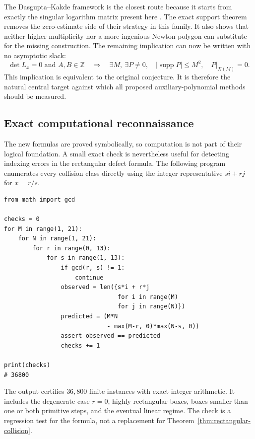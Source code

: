 \documentclass[11pt,oneside]{article}
\theoremstyle{definition}
\theoremstyle{remark}
\newcommand{\Z}{\mathbb Z}
\newcommand{\supp}{\operatorname{supp}}
\begin{document}
The Dasgupta--Kakde framework is the closest route because it starts from exactly the singular
logarithm matrix present here \cite{DasguptaKakde2026}.  The exact support theorem removes the
zero-estimate side of their strategy in this family.  It also shows that neither higher
multiplicity nor a more ingenious Newton polygon can substitute for the missing construction.
The remaining implication can now be written with no asymptotic slack:
\[
  \det L_x=0\text{ and }A,B\in\Z
  \quad\Longrightarrow\quad
  \exists M,\ \exists P\ne0,
  \quad |\supp P|\le M^2,
  \quad P|_{X(M)}=0.
\]
This implication is equivalent to the original conjecture.  It is therefore the natural
central target against which all proposed auxiliary-polynomial methods should be measured.

\subsection{Exact computational reconnaissance}
\label{sec:sparse-computation}

The new formulas are proved symbolically, so computation is not part of their logical
foundation.  A small exact check is nevertheless useful for detecting indexing errors in the
rectangular defect formula.  The following program enumerates every collision class directly
using the integer representative $si+rj$ for $x=r/s$.

\begin{lstlisting}[style=pythonstyle,caption={Exact check of the rectangular collision formula.},label={lst:collision-check}]
from math import gcd

checks = 0
for M in range(1, 21):
    for N in range(1, 21):
        for r in range(0, 13):
            for s in range(1, 13):
                if gcd(r, s) != 1:
                    continue
                observed = len({s*i + r*j
                                for i in range(M)
                                for j in range(N)})
                predicted = (M*N
                             - max(M-r, 0)*max(N-s, 0))
                assert observed == predicted
                checks += 1

print(checks)
# 36800
\end{lstlisting}

The output certifies $36{,}800$ finite instances with exact integer arithmetic.  It includes
the degenerate case $r=0$, highly rectangular boxes, boxes smaller than one or both primitive
steps, and the eventual linear regime.  The check is a regression test for the formula, not a
replacement for Theorem~\ref{thm:rectangular-collision}.
\end{document}
